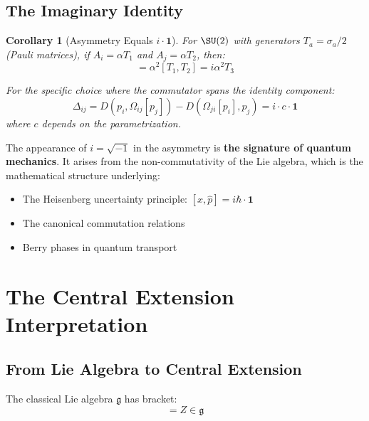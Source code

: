 \documentclass[11pt,a4paper]{article}
\newtheorem{corollary}[theorem]{Corollary}
\newcommand{\id}{\mathbf{1}}
\begin{document}
\subsection{The Imaginary Identity}

\begin{corollary}[Asymmetry Equals $i \cdot \id$]
For $\SU(2)$ with generators $T_a = \sigma_a/2$ (Pauli matrices), if $A_i = \alpha T_1$ and $A_j = \alpha T_2$, then:
\begin{equation}
    [A_i, A_j] = \alpha^2 [T_1, T_2] = i\alpha^2 T_3
\end{equation}

For the specific choice where the commutator spans the identity component:
\begin{equation}
    \boxed{\Delta_{ij} = D(p_i, \Omega_{ij}[p_j]) - D(\Omega_{ji}[p_i], p_j) = i \cdot c \cdot \id}
\end{equation}
where $c$ depends on the parametrization.
\end{corollary}

\begin{physicalinsight}
The appearance of $i = \sqrt{-1}$ in the asymmetry is \textbf{the signature of quantum mechanics}. It arises from the non-commutativity of the Lie algebra, which is the mathematical structure underlying:
\begin{itemize}
    \item The Heisenberg uncertainty principle: $[\hat{x}, \hat{p}] = i\hbar \cdot \id$
    \item The canonical commutation relations
    \item Berry phases in quantum transport
\end{itemize}
\end{physicalinsight}

\section{The Central Extension Interpretation}

\subsection{From Lie Algebra to Central Extension}

The classical Lie algebra $\mathfrak{g}$ has bracket:
\begin{equation}
    [X, Y] = Z \in \mathfrak{g}
\end{equation}
\end{document}
